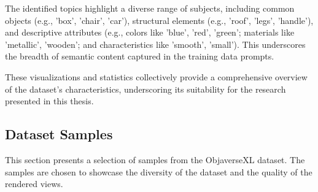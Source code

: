 The identified topics highlight a diverse range of subjects, including common objects (e.g., 'box', 'chair', 'car'), structural elements (e.g., 'roof', 'legs', 'handle'), and descriptive attributes (e.g., colors like 'blue', 'red', 'green'; materials like 'metallic', 'wooden'; and characteristics like 'smooth', 'small'). This underscores the breadth of semantic content captured in the training data prompts.

These visualizations and statistics collectively provide a comprehensive overview of the dataset's characteristics, underscoring its suitability for the research presented in this thesis.

\subsection{Dataset Samples}\label{ssec:dataset-samples}
This section presents a selection of samples from the ObjaverseXL dataset. The samples are chosen to showcase the diversity of the dataset and the quality of the rendered views.

